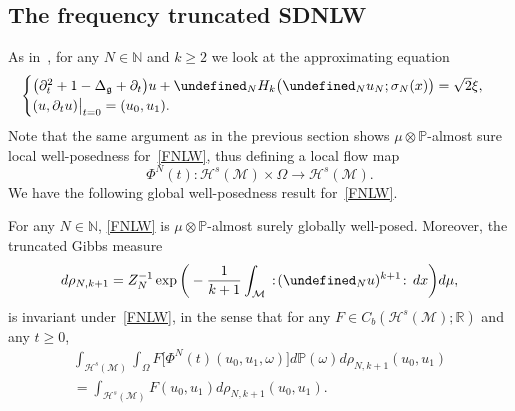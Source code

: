 \documentclass[AHL,Unicode,longabstracts,published]{cedram}
\newcommand{\R}{\mathbb{R}}
\newcommand{\Prob}{\mathbb{P}}
\newcommand{\N}{\mathbb{N}}
\let\P= \undefined
\newcommand{\P}{\mathbf{P}}
\newcommand{\M}{\mathcal{M}}
\renewcommand{\H}{\mathcal{H}}
\newcommand{\g}{\mathfrak{g}}
\newcommand{\Dlg}{\Delta_{\g}}
\newcommand{\s}{\sigma}
\newcommand{\dt}{\partial_t}
\renewcommand{\o}{\omega}
\renewcommand{\O}{\Omega}
\begin{document}
\subsection{The frequency truncated SDNLW}
As in~\cite{BO96,Tz,BT2,BTT2}, for any $N\in\N$ and $k\ge 2$ we look at the approximating equation
\begin{equation}\label{FNLW}
\begin{cases}
\big(\dt^2+1-\Dlg + \dt\big)u + \P_NH_k\big(\P_Nu_N;\s_N(x)\big) = \sqrt{2}\xi,\\
(u,\dt u)\big|_{t=0}=(u_0,u_1).
\end{cases}
\end{equation}
Note that the same argument as in the previous section shows $\mu\otimes\Prob$-almost sure local well-posedness for~\eqref{FNLW}, thus defining a local flow map
\begin{equation*}
\Phi^N(t) : \H^s(\M)\times \O \to \H^s(\M).
\end{equation*}
We have the following global well-posedness result for~\eqref{FNLW}.

\begin{prop}\label{prop-FNLW}
For any $N\in\N$, \eqref{FNLW} is $\mu\otimes\Prob$-almost surely globally well-posed. Moreover, the truncated Gibbs measure
\begin{equation}\label{rhoN}
d\rho_{N,k+1}=Z_N^{-1}\exp\bigg(-\frac{1}{k+1}\int_{\M}\,:\!(\P_N u)^{k+1}\!:\,dx\bigg)d\mu,
\end{equation}
is invariant under~\eqref{FNLW}, in the sense that for any $F\in C_b(\H^s(\M);\R)$ and any $t\ge 0$,
\begin{multline*}
\int_{\H^s(\M)}\int_\O F\big[\Phi^N(t)(u_0,u_1,\o)\big]d\Prob(\o)d\rho_{N,k+1}(u_0,u_1)\\ = \int_{\H^s(\M)}F(u_0,u_1)d\rho_{N,k+1}(u_0,u_1).
\end{multline*}
\end{prop}
\end{document}
